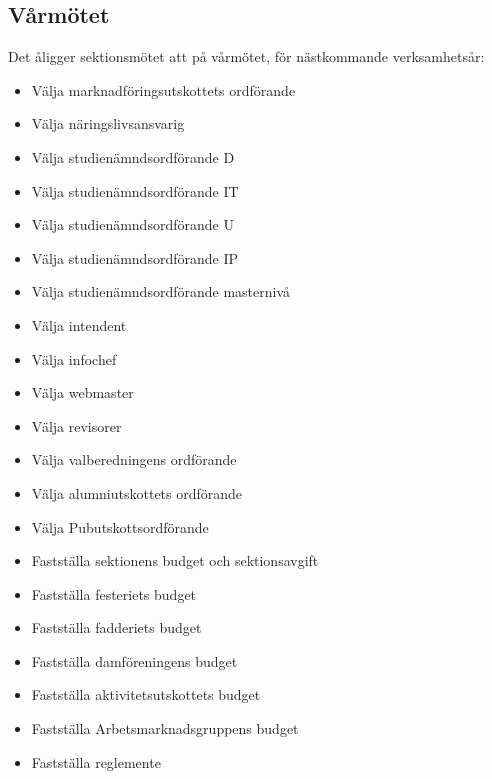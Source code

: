 \documentclass{datateknologsektionen-document}
\begin{document}
\subsection{Vårmötet}
Det åligger sektionsmötet att på vårmötet, för nästkommande verksamhetsår:
\begin{itemize}
  \item Välja marknadföringsutskottets ordförande
  \item Välja näringslivsansvarig
  \item Välja studienämndsordförande D
  \item Välja studienämndsordförande IT
  \item Välja studienämndsordförande U
  \item Välja studienämndsordförande IP
  \item Välja studienämndsordförande masternivå
  \item Välja intendent
  \item Välja infochef
  \item Välja webmaster
  \item Välja revisorer
  \item Välja valberedningens ordförande
  \item Välja alumniutskottets ordförande
  \item Välja Pubutskottsordförande
  \item Fastställa sektionens budget och sektionsavgift
  \item Fastställa festeriets budget
  \item Fastställa fadderiets budget
  \item Fastställa damföreningens budget
  \item Fastställa aktivitetsutskottets budget
  \item Fastställa Arbetsmarknadsgruppens budget
  \item Fastställa reglemente
\end{itemize}
\end{document}
